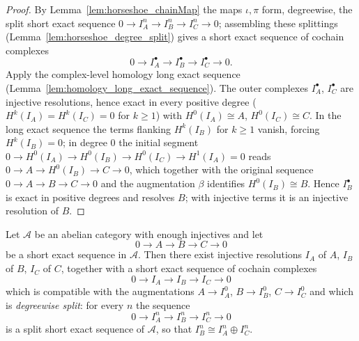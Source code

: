 \begin{proof}
  By Lemma~\ref{lem:horseshoe_chainMap} the maps \(\iota, \pi\) form, degreewise, the
  split short exact sequence \(0 \to I_A^n \to I_B^n \to I_C^n \to 0\); assembling these
  splittings (Lemma~\ref{lem:horseshoe_degree_split}) gives a short exact sequence of
  cochain complexes
  \[
    0 \longrightarrow I_A^\bullet \longrightarrow I_B^\bullet
      \longrightarrow I_C^\bullet \longrightarrow 0 .
  \]
  Apply the complex-level homology long exact sequence
  (Lemma~\ref{lem:homology_long_exact_sequence}). The outer complexes \(I_A^\bullet\),
  \(I_C^\bullet\) are injective resolutions, hence exact in every positive degree
  (\(H^{k}(I_A) = H^{k}(I_C) = 0\) for \(k \geq 1\)) with \(H^0(I_A) \cong A\),
  \(H^0(I_C) \cong C\). In the long exact sequence the terms flanking \(H^{k}(I_B)\) for
  \(k \geq 1\) vanish, forcing \(H^{k}(I_B) = 0\); in degree \(0\) the initial segment
  \(0 \to H^0(I_A) \to H^0(I_B) \to H^0(I_C) \to H^1(I_A) = 0\) reads
  \(0 \to A \to H^0(I_B) \to C \to 0\), which together with the original sequence
  \(0 \to A \to B \to C \to 0\) and the augmentation \(\beta\) identifies
  \(H^0(I_B) \cong B\). Hence \(I_B^\bullet\) is exact in positive degrees and resolves
  \(B\); with injective terms it is an injective resolution of \(B\).
\end{proof}

\begin{lemma}\leanok
  \label{lem:injective_resolution_of_ses}
  Let \(\mathcal{A}\) be an abelian category with enough injectives and let
  \[
    0 \longrightarrow A \longrightarrow B \longrightarrow C \longrightarrow 0
  \]
  be a short exact sequence in \(\mathcal{A}\). Then there exist injective
  resolutions \(I_A\) of \(A\), \(I_B\) of \(B\), \(I_C\) of \(C\), together with a
  short exact sequence of cochain complexes
  \[
    0 \longrightarrow I_A \longrightarrow I_B \longrightarrow I_C \longrightarrow 0
  \]
  which is compatible with the augmentations \(A \to I_A^0\), \(B \to I_B^0\),
  \(C \to I_C^0\) and which is \emph{degreewise split}: for every \(n\) the sequence
  \[
    0 \longrightarrow I_A^n \longrightarrow I_B^n \longrightarrow I_C^n
      \longrightarrow 0
  \]
  is a split short exact sequence of \(\mathcal{A}\), so that
  \(I_B^n \cong I_A^n \oplus I_C^n\).
\end{lemma}

